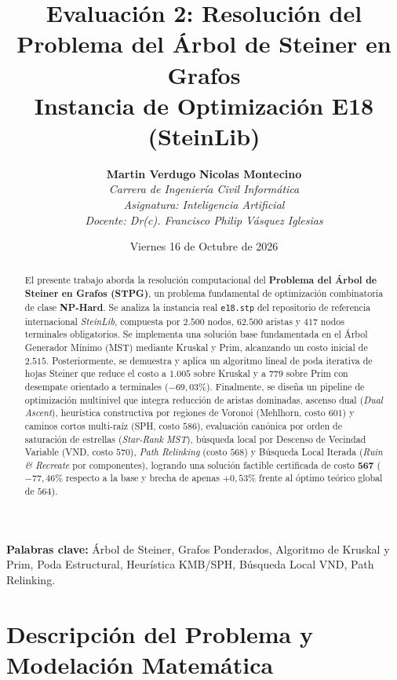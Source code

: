 \documentclass[11pt,a4paper]{article}
\title{
    \vspace{-1.5cm}
    \textbf{\Large Evaluación 2: Resolución del Problema del Árbol de Steiner en Grafos}\\
    \large Instancia de Optimización E18 (SteinLib)
}
\author{
    \textbf{Martin Verdugo} \quad \textbf{Nicolas Montecino} \\[0.2cm]
    \textit{Carrera de Ingeniería Civil Informática} \\
    \textit{Asignatura: Inteligencia Artificial} \\
    \textit{Docente: Dr(c). Francisco Philip Vásquez Iglesias}
}
\date{Viernes 16 de Octubre de 2026}
\begin{document}
\maketitle

\begin{abstract}
El presente trabajo aborda la resolución computacional del \textbf{Problema del Árbol de Steiner en Grafos (STPG)}, un problema fundamental de optimización combinatoria de clase \textbf{NP-Hard}. Se analiza la instancia real \texttt{e18.stp} del repositorio de referencia internacional \textit{SteinLib}, compuesta por $2.500$ nodos, $62.500$ aristas y $417$ nodos terminales obligatorios. Se implementa una solución base fundamentada en el Árbol Generador Mínimo (MST) mediante Kruskal y Prim, alcanzando un costo inicial de $2.515$. Posteriormente, se demuestra y aplica un algoritmo lineal de poda iterativa de hojas Steiner que reduce el costo a $1.005$ sobre Kruskal y a $779$ sobre Prim con desempate orientado a terminales ($-69,03\%$). Finalmente, se diseña un pipeline de optimización multinivel que integra reducción de aristas dominadas, ascenso dual (\textit{Dual Ascent}), heurística constructiva por regiones de Voronoi (Mehlhorn, costo $601$) y caminos cortos multi-raíz (SPH, costo $586$), evaluación canónica por orden de saturación de estrellas (\textit{Star-Rank MST}), búsqueda local por Descenso de Vecindad Variable (VND, costo $570$), \textit{Path Relinking} (costo $568$) y Búsqueda Local Iterada (\textit{Ruin \& Recreate} por componentes), logrando una solución factible certificada de costo $\mathbf{567}$ ($-77,46\%$ respecto a la base y brecha de apenas $+0,53\%$ frente al óptimo teórico global de $564$).
\end{abstract}

\vspace{0.3cm}
\noindent\textbf{Palabras clave:} Árbol de Steiner, Grafos Ponderados, Algoritmo de Kruskal y Prim, Poda Estructural, Heurística KMB/SPH, Búsqueda Local VND, Path Relinking.

\vspace{0.5cm}

\section{Descripción del Problema y Modelación Matemática}
\label{sec:modelacion}
\end{document}
